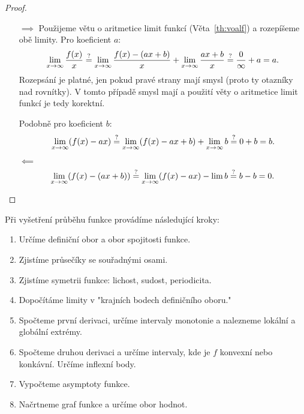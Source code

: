 \begin{proof}
    \leavevmode
    \begin{itemize}
        \item[$\implies$] Použijeme větu o aritmetice limit funkcí 
            (Věta~\ref{th:voalf}) a rozepíšeme obě limity. Pro koeficient $a$:
            $$\lim_{x \to \infty} \frac{f(x)}{x} 
            \stackrel{?}{=} \lim_{x \to \infty} \frac{f(x) - (ax + b)}{x} + \lim_{x \to \infty} \frac{ax+b}{x}
            \stackrel{?}{=} \frac{0}{\infty} + a = a.$$
            Rozepsání je platné, jen pokud pravé strany mají smysl (proto ty 
            otazníky nad rovnítky). V tomto případě smysl mají a použití věty o 
            aritmetice limit funkcí je tedy korektní.

            Podobně pro koeficient $b:$
            $$\lim_{x \to \infty} (f(x) - ax) 
            \stackrel{?}{=} \lim_{x \to \infty} (f(x) - ax + b) + \lim_{x \to \infty} b 
            \stackrel{?}{=} 0 + b = b.$$
        \item[$\impliedby$]
            $$\lim_{x \to \infty} (f(x) - (ax + b)) 
            \stackrel{?}{=} \lim_{x \to \infty} (f(x) - ax) - \lim b
            \stackrel{?}{=} b - b = 0.$$
    \end{itemize}
\end{proof}

\begin{remark}
    \label{rm:prubehfce}
    Při vyšetření průběhu funkce provádíme následující kroky:
    \begin{enumerate}
        \item Určíme definiční obor a obor spojitosti funkce.
        \item Zjistíme průsečíky se souřadnými osami.
        \item Zjistíme symetrii funkce: lichost, sudost, periodicita.
        \item Dopočítáme limity v "krajních bodech definičního oboru."
        \item Spočteme první derivaci, určíme intervaly monotonie a 
            nalezneme lokální a globální extrémy.
        \item Spočteme druhou derivaci a určíme intervaly, kde je $f$ konvexní
            nebo konkávní. Určíme inflexní body.
        \item Vypočteme asymptoty funkce.
        \item Načrtneme graf funkce a určíme obor hodnot.
    \end{enumerate}
\end{remark}

